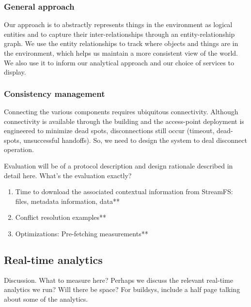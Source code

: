 \subsubsection{General approach}
Our approach is to abstractly represents things in the environment as logical entities and to capture their inter-relationships through an entity-relationship graph.  We use the entity relationships to track where objects and things are in the environment, which helps us maintain a more consistent view of the world.  We also use  it to inform our analytical approach and our choice of services to display.

\subsubsection{Consistency management}
Connecting the various components requires ubiquitous connectivity.  Although connectivity is available through the building and the access-point deployment is engineered to minimize dead spots, disconnections still occur (timeout, dead-spots, unsuccessful handoffs).  So, we need to design the system to deal disconnect operation.

Evaluation will be of a protocol description and design rationale described in detail here.
What’s the evaluation exactly?

\begin{enumerate}
\item Time to download the associated contextual information from StreamFS: files, metadata information, data**
\item Conflict resolution examples**
\item Optimizations: Pre-fetching measurements**
\end{enumerate}

\subsection{Real-time analytics}
Discussion.  What to measure here?  Perhaps we discuss the relevant real-time analytics we run?  Will there be space?  For buildsys, include a half page talking about some of the analytics.



